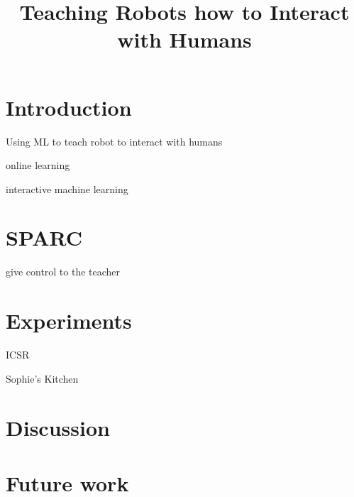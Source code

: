 \documentclass[conference]{IEEEtran}
\begin{document}
\title{Teaching Robots how to Interact with Humans}

\author{
}

\maketitle

\begin{abstract}



\end{abstract}

\section{Introduction}

Using ML to teach robot to interact with humans

online learning 

interactive machine learning

\section{SPARC}

give control to the teacher

\section{Experiments}

ICSR

Sophie's Kitchen

\section{Discussion}

\section{Future work}

\cite{senft2015sparc}

 
\end{document}
